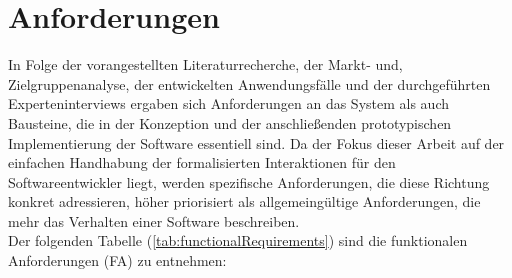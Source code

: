 \section{Anforderungen}
\label{sec:requirementsFinal}
    In Folge der vorangestellten Literaturrecherche, der Markt- und, Zielgruppenanalyse, der entwickelten Anwendungsfälle und 
    der durchgeführten Experteninterviews ergaben sich Anforderungen an das System als auch Bausteine, die in der 
    Konzeption und der anschließenden prototypischen Implementierung der Software essentiell sind. Da der Fokus dieser 
    Arbeit auf der einfachen Handhabung der formalisierten Interaktionen für den Softwareentwickler liegt, werden 
    spezifische Anforderungen, die diese Richtung konkret adressieren, höher priorisiert als allgemeingültige Anforderungen, die mehr das 
    Verhalten einer Software beschreiben. 
    \\
    \linebreak
    Der folgenden Tabelle (\ref{tab:functionalRequirements}) sind die funktionalen Anforderungen (FA) zu entnehmen: 
